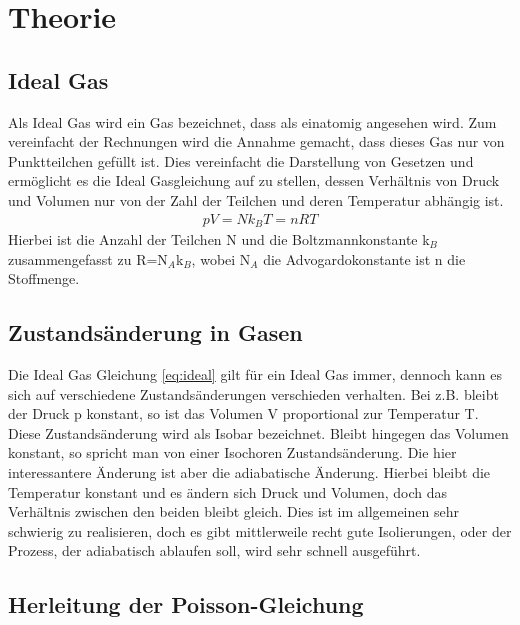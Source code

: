 \documentclass[12pt,a4paper,titlepage,headinclude,bibtotoc]{scrartcl}
\begin{document}
\section{Theorie}
\label{sec:theorie}

\subsection{Ideal Gas}
Als Ideal Gas wird ein Gas bezeichnet, dass als einatomig angesehen wird.
Zum vereinfacht der Rechnungen wird die Annahme gemacht, dass dieses Gas nur von Punktteilchen gefüllt ist.
Dies vereinfacht die Darstellung von Gesetzen und ermöglicht es die Ideal Gasgleichung auf zu stellen, dessen Verhältnis von Druck und Volumen nur von der Zahl der Teilchen und deren Temperatur abhängig ist.
\begin{align}
	pV=Nk_BT=nRT\label{eq:ideal}
\end{align}
Hierbei ist die Anzahl der Teilchen N und die Boltzmannkonstante k$_B$ zusammengefasst zu R=N$_A$k$_B$, wobei N$_A$ die Advogardokonstante ist n die Stoffmenge.

\subsection{Zustandsänderung in Gasen}
Die Ideal Gas Gleichung \eqref{eq:ideal} gilt für ein Ideal Gas immer, dennoch kann es sich auf verschiedene Zustandsänderungen verschieden verhalten.
Bei z.B. bleibt der Druck p konstant, so ist das Volumen V proportional zur Temperatur T.
Diese Zustandsänderung wird als Isobar bezeichnet.
Bleibt hingegen das Volumen konstant, so spricht man von einer Isochoren Zustandsänderung.
Die hier interessantere Änderung ist aber die adiabatische Änderung.
Hierbei bleibt die Temperatur konstant und es ändern sich Druck und Volumen, doch das Verhältnis zwischen den beiden bleibt gleich.
Dies ist im allgemeinen sehr schwierig zu realisieren, doch es gibt mittlerweile recht gute Isolierungen, oder der Prozess, der adiabatisch ablaufen soll, wird sehr schnell ausgeführt.

\subsection{Herleitung der Poisson-Gleichung}
\end{document}
